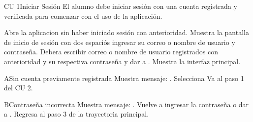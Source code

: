 \begin{UseCase} {CU 1}{Iniciar Sesión}{
	El alumno debe iniciar sesión con una cuenta registrada y verificada para comenzar con el uso de la aplicación.
}





\end{UseCase}


\begin{UCtrayectoria}
	
	\UCpaso [\UCactor]	Abre la aplicacion sin haber iniciado sesión con anterioridad. 
	\UCpaso [\UCsist]Muestra la pantalla de inicio de sesión con dos espaciós ingresar su correo o nombre de usuario y contraseña.
	\UCpaso [\UCactor]Debera escribir correo o nombre de usuario registrados con anterioridad y su respectiva contraseña y dar a . 
	\UCpaso [\UCsist]Muestra la interfaz principal.
\end{UCtrayectoria}



\begin{UCtrayectoriaA}{A}{Sin cuenta previamente registrada}
	\UCpaso [\UCsist]Muestra mensaje: .
	\UCpaso [\UCactor]	Selecciona 
	\UCpaso Va al paso 1 del CU 2.
\end{UCtrayectoriaA}

\begin{UCtrayectoriaA}{B}{Contraseña incorrecta}
	\UCpaso [\UCsist]Muestra mensaje: .
	\UCpaso [\UCactor]	Vuelve a ingresar la contraseña o dar a .
	\UCpaso Regresa al paso 3 de la trayectoria principal.
\end{UCtrayectoriaA}
